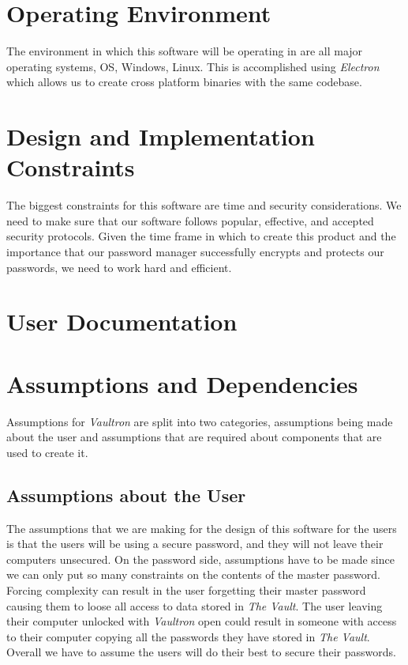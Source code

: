 \documentclass[11pt]{report}
\begin{document}
\section{Operating Environment}
The environment in which this software will be operating in are all
major operating systems, OS, Windows, Linux. This is accomplished using
\textit{Electron} which allows us to create cross platform binaries
with the same codebase.

\section{Design and Implementation Constraints}
The biggest constraints for this software are time and security considerations.
We need to make sure that our software follows popular, effective, and
accepted security protocols. Given the time frame in which to create this
product and the importance that our password manager successfully encrypts
and protects our passwords, we need to work hard and efficient.

\section{User Documentation}

\section{Assumptions and Dependencies}
Assumptions for \textit{Vaultron} are split into two categories, assumptions
being made about the user and assumptions that are required about components
that are used to create it. 

\subsection{Assumptions about the User}
The assumptions that we are making for the design of this software for the users is
that the users will be using a secure password, and they will not leave
their computers unsecured. On the password side, assumptions have to be
made since we can only put so many constraints on the contents of the
master password. Forcing complexity can result in the user forgetting 
their master password causing them to loose all access to data stored in
\textit{The Vault}. The user leaving their computer unlocked with 
\textit{Vaultron} open could result in someone with access to their computer
copying all the passwords they have stored in \textit{The Vault}. Overall
we have to assume the users will do their best to secure their passwords.
\end{document}
